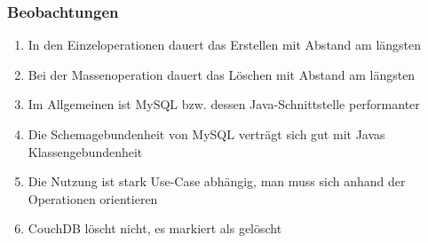 \subsubsection{Beobachtungen}
\begin{enumerate}
    \item In den Einzeloperationen dauert das Erstellen mit Abstand am längsten
    \item Bei der Massenoperation dauert das Löschen mit Abstand am längsten
    \item Im Allgemeinen ist MySQL bzw. dessen Java-Schnittstelle performanter
    \item Die Schemagebundenheit von MySQL verträgt sich gut mit Javas Klassengebundenheit
    \item Die Nutzung ist stark Use-Case abhängig, man muss sich anhand der Operationen orientieren
    \item CouchDB löscht nicht, es markiert als gelöscht
\end{enumerate}